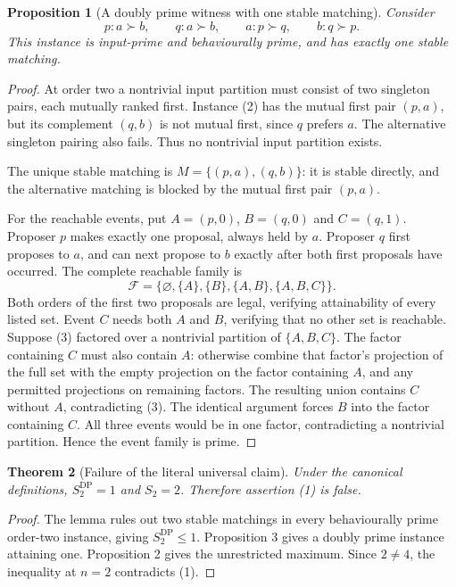 \documentclass[11pt,a4paper]{article}
\newtheorem{theorem}{Theorem}
\newtheorem{proposition}[theorem]{Proposition}
\begin{document}
\begin{proposition}[A doubly prime witness with one stable matching]
Consider
\[
 p:a\succ b,\qquad q:a\succ b,\qquad
 a:p\succ q,\qquad b:q\succ p.                         \tag{2}
\]
This instance is input-prime and behaviourally prime, and has exactly one stable matching.
\end{proposition}
\begin{proof}
At order two a nontrivial input partition must consist of two singleton pairs, each mutually ranked first. Instance (2) has the mutual first pair $(p,a)$, but its complement $(q,b)$ is not mutual first, since $q$ prefers $a$. The alternative singleton pairing also fails. Thus no nontrivial input partition exists.

The unique stable matching is $M=\{(p,a),(q,b)\}$: it is stable directly, and the alternative matching is blocked by the mutual first pair $(p,a)$.

For the reachable events, put $A=(p,0)$, $B=(q,0)$ and $C=(q,1)$. Proposer $p$ makes exactly one proposal, always held by $a$. Proposer $q$ first proposes to $a$, and can next propose to $b$ exactly after both first proposals have occurred. The complete reachable family is
\[
 \mathcal F=\{\varnothing,\{A\},\{B\},\{A,B\},\{A,B,C\}\}.\tag{3}
\]
Both orders of the first two proposals are legal, verifying attainability of every listed set. Event $C$ needs both $A$ and $B$, verifying that no other set is reachable.
Suppose (3) factored over a nontrivial partition of $\{A,B,C\}$. The factor containing $C$ must also contain $A$: otherwise combine that factor's projection of the full set with the empty projection on the factor containing $A$, and any permitted projections on remaining factors. The resulting union contains $C$ without $A$, contradicting (3). The identical argument forces $B$ into the factor containing $C$. All three events would be in one factor, contradicting a nontrivial partition. Hence the event family is prime.
\end{proof}

\begin{theorem}[Failure of the literal universal claim]
Under the canonical definitions, $S_2^{\mathrm{DP}}=1$ and $S_2=2$. Therefore assertion (1) is false.
\end{theorem}
\begin{proof}
The lemma rules out two stable matchings in every behaviourally prime order-two instance, giving $S_2^{\mathrm{DP}}\leq1$. Proposition 3 gives a doubly prime instance attaining one. Proposition 2 gives the unrestricted maximum. Since $2\ne4$, the inequality at $n=2$ contradicts (1).
\end{proof}
\end{document}
